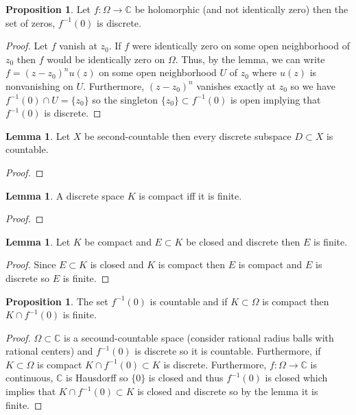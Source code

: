 \documentclass[12pt]{extarticle}
\newcommand{\C}{\mathbb{C}}
\theoremstyle{definition}
\newtheorem{lemma}[theorem]{Lemma}
\newtheorem{proposition}[theorem]{Proposition}
\begin{document}
\begin{proposition}
Let $f : \Omega \to \C$ be holomorphic (and not identically zero) then the set of zeros, $f^{-1}(0)$ is discrete.
\end{proposition}

\begin{proof}
Let $f$ vanish at $z_0$. If $f$ were identically zero on some open neighborhood of $z_0$ then $f$ would be identically zero on $\Omega$. Thus, by the lemma, we can write $f = (z - z_0)^n u(z)$ on some open neighborhood $U$ of $z_0$ where $u(z)$ is nonvanishing on $U$. Furthermore, $(z - z_0)^n$ vanishes exactly at $z_0$ so we have $f^{-1}(0) \cap U = \{ z_0 \}$ so the singleton $\{ z_0 \} \subset f^{-1}(0)$ is open implying that $f^{-1}(0)$ is discrete. 
\end{proof}

\begin{lemma}
Let $X$ be second-countable then every discrete subspace $D \subset X$ is countable.
\end{lemma}

\begin{proof}

\end{proof}

\begin{lemma}
A discrete space $K$ is compact iff it is finite.
\end{lemma}

\begin{proof}

\end{proof}

\begin{lemma}
Let $K$ be compact and $E \subset K$ be closed and discrete then $E$ is finite. 
\end{lemma}

\begin{proof}
Since $E \subset K$ is closed and $K$ is compact then $E$ is compact and $E$ is discrete so $E$ is finite.
\end{proof}

\begin{proposition}
The set $f^{-1}(0)$ is countable and if $K \subset \Omega$ is compact then $K \cap f^{-1}(0)$ is finite. 
\end{proposition}

\begin{proof}
$\Omega \subset \C$ is a secound-countable space (consider rational radius balls with rational centers) and $f^{-1}(0)$ is discrete so it is countable. Furthermore, if $K \subset \Omega$ is compact $K \cap f^{-1}(0) \subset K$ is discrete. Furthermore, $f : \Omega \to \C$ is continuous, $\C$ is Hausdorff so $\{ 0 \}$ is closed and thus $f^{-1}(0)$ is closed which implies that $K \cap f^{-1}(0) \subset K$ is closed and discrete so by the lemma it is finite. 
\end{proof}
\end{document}
